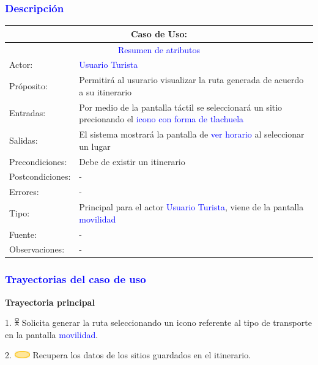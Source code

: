 \subsubsection{\textcolor{blue}{Descripción}}
\begin{tabularx}{16cm}{||l|X||}
	\hline
	\multicolumn{2}{||c||}{Caso de Uso: } \\
	\hline
	\multicolumn{2}{||c||}{\textcolor{blue}{Resumen de atributos}} \\
	\hline
	{Actor:} & {\textcolor{blue}{Usuario Turista}} \\
	\hline
	{Próposito:} & {Permitirá al usurario visualizar la ruta generada de acuerdo a su itinerario} \\
	\hline
	{Entradas:} & {Por medio de la pantalla táctil se seleccionará un sitio precionando el \textcolor{blue}{icono con forma de tlachuela}}\\
	\hline
	{Salidas:} & {El sistema mostrará la pantalla de \textcolor{blue}{ver horario} al seleccionar un lugar}\\
	\hline
	{Precondiciones:} & {Debe de existir un itinerario}\\ 
	\hline
	{Postcondiciones:} & {-}\\
	\hline
	{Errores:} & {-} \\
	\hline
	{Tipo:} & {Principal para el actor \textcolor{blue}{Usuario Turista}, viene de la pantalla \textcolor{blue}{movilidad}}\\
	\hline
	{Fuente:} & {-} \\
	\hline
	{Observaciones:} & {-} \\
	\hline
\end{tabularx}

\pagebreak
\subsubsection{\textcolor{blue}{Trayectorias del caso de uso}}
\textbf{Trayectoria principal}
    
    1. \includegraphics[width=0.0150\textwidth]{Figuras/persona.png} Solicita generar la ruta seleccionando un icono referente al tipo de transporte en la pantalla \textcolor{blue}{movilidad}.
    
      2. \includegraphics[width=0.0500\textwidth]{Figuras/sistema.png} Recupera los datos de los sitios guardados en el itinerario.

